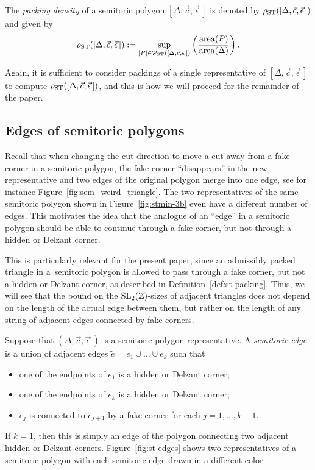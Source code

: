 \documentclass[10pt,a4paper]{amsart}
\numberwithin{equation}{section}
\def\Z{{\mathbb Z}}
\newcommand{\De}{\Delta}
\newcommand{\area}{\operatorname{area}}
\newcommand{\PST}{\mathcal{P}_{\rm ST}}
\newcommand{\SL}{{\rm SL}_2(\Z)}
\newcommand{\stpoly}{[\De,\vec{c},\vec{\epsilon}\,]}
\newcommand{\strep}{(\De,\vec{c},\vec{\epsilon}\,)}
\theoremstyle{definition}
\theoremstyle{plain}
\theoremstyle{plain}
\begin{document}
\begin{Definition}\label{def:semitoric-density}
The \emph{packing density} of a semitoric polygon $\stpoly$ is denoted by $\rho_{{\rm ST}}(\stpoly)$ and given by
\[
 \rho_{{\rm ST}}(\stpoly): = \sup_{[P] \in \PST(\stpoly)}\left( \frac{\area(P)}{\area(\De)}\right).
\]
\end{Definition}


Again, it is sufficient to consider packings of a single representative of $\stpoly$ to compute $\rho_{{\rm ST}}(\stpoly)$, and this is how we will proceed for the remainder of the paper.






\subsection{Edges of semitoric polygons}
\label{sec:semitoric-edge}
Recall that when changing the cut direction to move a cut away from a fake corner in a semitoric polygon, the fake corner ``disappears'' in the new representative and two edges of the original polygon merge into one edge, see for instance Figure~\ref{fig:sem_weird_triangle}.
The two representatives of the same semitoric polygon shown in Figure~\ref{fig:stmin-3b} even have a different number of edges.
This motivates the idea that the analogue of an ``edge'' in a semitoric polygon should be able to continue through a fake corner, but not through a hidden or Delzant corner.


This is particularly relevant for the present paper, since an admissibly packed triangle in a~semitoric polygon is allowed to pass through a fake corner, but not a hidden or Delzant corner, as described in Definition~\ref{def:st-packing}.
Thus, we will see that the bound on the $\SL$-sizes of adjacent triangles does not depend on the length of the actual edge between them, but rather on the length of any string of adjacent edges connected by fake corners.

\begin{Definition}\label{def:st-edge}
Suppose that $\strep$ is a semitoric polygon representative.
A \emph{semitoric edge} is a union of adjacent edges $\tilde{e} = e_1\cup \dots \cup e_k$ such that
\begin{itemize}\itemsep=0pt
 \item one of the endpoints of $e_1$ is a hidden or Delzant corner;
 \item one of the endpoints of $e_k$ is a hidden or Delzant corner;
 \item $e_j$ is connected to $e_{j+1}$ by a fake corner for each $j=1,\ldots, k-1$.
\end{itemize}
\end{Definition}
If $k=1$, then this is simply an edge of the polygon connecting two adjacent hidden or Delzant corners.
Figure~\ref{fig:st-edges} shows two representatives of a semitoric polygon with each semitoric edge drawn in a different color.
\end{document}
